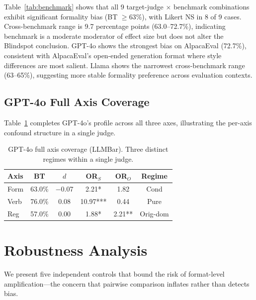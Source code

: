 \documentclass[11pt,twocolumn]{article}
\begin{document}
Table~\ref{tab:benchmark} shows that all 9 target-judge $\times$ benchmark combinations exhibit significant formality bias (BT $\geq 63\%$), with Likert NS in 8 of 9 cases. Cross-benchmark range is 9.7 percentage points (63.0--72.7\%), indicating benchmark is a moderate moderator of effect size but does not alter the Blindspot conclusion. GPT-4o shows the strongest bias on AlpacaEval (72.7\%), consistent with AlpacaEval's open-ended generation format where style differences are most salient. Llama shows the narrowest cross-benchmark range (63--65\%), suggesting more stable formality preference across evaluation contexts.

\subsection{GPT-4o Full Axis Coverage}
\label{sec:gpt4o_full}

Table~\ref{tab:gpt4o_axes} completes GPT-4o's profile across all three axes, illustrating the per-axis confound structure in a single judge.

\begin{table}[t]
\centering
\small
\caption{GPT-4o full axis coverage (LLMBar). Three distinct regimes within a single judge.}
\label{tab:gpt4o_axes}
\begin{tabular}{@{}lccccc@{}}
\toprule
Axis & BT & $d$ & OR$_S$ & OR$_O$ & Regime \\
\midrule
Form & 63.0\% & $-$0.07 & 2.21* & 1.82 & Cond \\
Verb & 76.0\% & 0.08 & 10.97*** & 0.44 & Pure \\
Reg & 57.0\% & 0.00 & 1.88* & 2.21** & Orig-dom \\
\bottomrule
\end{tabular}
\vspace{-2mm}
\end{table}

\section{Robustness Analysis}
\label{sec:robustness}

We present five independent controls that bound the risk of format-level amplification---the concern that pairwise comparison inflates rather than detects bias.
\end{document}

